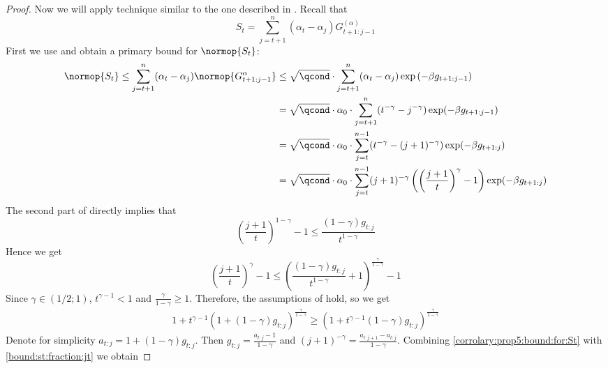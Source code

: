 \begin{proof}
    Now we will apply technique similar to the one described in \citep[pp. 25-26]{wu2024statisticalinferencetemporaldifference}. Recall that
    \begin{equation}
        S_t = \sum_{j=t+1}^{n} (\alpha_t - \alpha_j) G_{t+1:j-1}^{(\alpha)}
    \end{equation}
    First we use {} and obtain a primary bound for $\normop{S_t}$:
    \begin{align}
        \label{proof:st:primary:bound}
        \normop{S_t} \leq \sum_{j=t+1}^n (\alpha_t - \alpha_j) \normop{G_{t+1:j-1}^{\alpha}} &\leq \sqrt{\qcond} \cdot \sum_{j=t+1}^n (\alpha_t - \alpha_j) \exp\left(-\beta g_{t+1:j-1} \right) \\ &= \sqrt{\qcond} \cdot \alpha_0 \cdot \sum_{j=t+1}^{n} (t^{-\gamma} - j^{-\gamma}) \exp(-\beta g_{t+1:j-1}) \\ &= \sqrt{\qcond} \cdot \alpha_0 \cdot \sum_{j=t}^{n-1} (t^{-\gamma} - (j+1)^{-\gamma}) \exp(-\beta g_{t+1:j}) \\ &= \sqrt{\qcond} \cdot \alpha_0 \cdot \sum_{j=t}^{n-1} (j+1)^{-\gamma} \left( \left(\frac{j+1}{t}\right)^{\gamma}  - 1\right) \exp(-\beta g_{t+1:j})
    \end{align}
    The second part of {} directly implies that
    \begin{equation}
        \label{bound:st:fraction:jt}
        \left(\frac{j+1}{t}\right)^{1-\gamma} - 1 \leq \frac{(1 - \gamma) g_{t:j}}{t^{1-\gamma}}
    \end{equation}
    Hence we get
        \begin{equation}
        \label{bound:st:fraction:jt}
        \left(\frac{j+1}{t}\right)^{\gamma} - 1 \leq \left(\frac{(1 - \gamma) g_{t:j}}{t^{1-\gamma}}+1\right)^{\frac{\gamma}{1-\gamma}} - 1
    \end{equation}
    Since $\gamma \in (1/2; 1)$, $t^{\gamma-1} < 1$ and $\frac{\gamma}{1-\gamma} \geq 1$. Therefore, the assumptions of  hold, so we get
    \begin{align}
        \label{corrolary:prop5:bound:for:St}
                 1 + t^{\gamma-1} \left(1 + (1-\gamma) g_{t:j}\right)^{\frac{\gamma}{1-\gamma}} \geq  \left(1+ t^{\gamma-1} (1-\gamma) g_{t:j} \right)^{\frac{\gamma}{1-\gamma}}
    \end{align}   
    Denote for simplicity $a_{t:j} = 1 + (1-\gamma) g_{t:j}$. Then $g_{t:j} = \frac{a_{t:j} -  1}{1 - \gamma}$ and $(j+1)^{-\gamma} = \frac{a_{t:j+1} - a_{t:j}}{1 - \gamma}$. Combining \eqref{corrolary:prop5:bound:for:St} with \eqref{bound:st:fraction:jt} we obtain

\end{proof}
